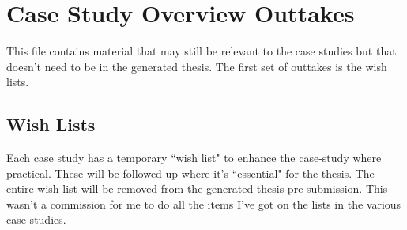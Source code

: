 \chapter{Case Study Overview Outtakes}
This file contains material that may still be relevant to the case studies but that doesn't need to be in the generated thesis. The first set of outtakes is the wish lists.

\section{Wish Lists}
Each case study has a temporary ``wish list" to enhance the case-study where practical. These will be followed up where it's ``essential" for the thesis. The entire wish list will be removed from the generated thesis pre-submission. This wasn't a commission for me to do all the items I've got on the lists in the various case studies.

